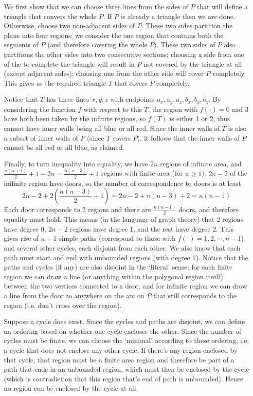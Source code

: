 \documentclass[11pt,a4paper]{article}
\begin{document}
\begin{enumerate}
	We first show that we can choose three lines from the sides of $P$ that will define a triangle that convers the whole $P$. If $P$ is already a triangle then we are done. Otherwise, choose two non-adjacent sides of $P$. These two sides partition the plane into four regions; we consider the one region that contains both the segments of $P$ (and therefore covering the whole $P$). 
	These two sides of $P$ also partitions the other sides into two consecutive sections; 
	choosing a side from one of the to complete the triangle will result in $P$ not covered by the triangle at all (except adjacent sides); choosing one from the other side will cover $P$ completely. This gives us the required triangle $T$ that covers $P$ completely. 
	
	Notice that $T$ has three lines $x, y, z$ with endpoints $a_x, a_y, a_z, b_x, b_y, b_z$. By considering the function $f$ with respect to this $T$, the region with $f(\cdot)=0$ and 3 have both been taken by the infinite regions, so $f(T)$ is either 1 or 2, thus cannot have inner walls being all blue or all red. Since the inner walls of $T$ is also a subset of inner walls of $P$ (since $T$ covers $P$), it follows that the inner walls of $P$ cannot be all red or all blue, as claimed. 
	
	Finally, to turn inequality into equality, we have $2n$ regions of infinite area, and $\frac{n(n+1)}{2}+1-2n=\frac{n(n-3)}{2}+1$ regions with finite area (for $n\ge 1$). 
	$2n-2$ of the inifinite region have doors, so the number of correspondence to doors is at least 
	\[
	2n-2+2(\frac{n(n-3)}{2}+1)=2n-2+n(n-3)+2=n(n-1)
	\]
	Each door corresponds to 2 regions and there are $\frac{n(n-1)}{2}$ doors, and therefore equality must hold. This means (in the language of graph theory) that 2 regions have degree 0, $2n-2$ regions have degree 1, and the rest have degree 2. This gives rise of $n-1$ simple paths (correspond to those with $f(\cdot)=1, 2, \cdots , n-1$) and several other cycles, each disjoint from each other. 
	We also know that each path must start and end with unbounded regions (with degree 1). 
	Notice that the paths and cycles (if any) are also disjoint in the `literal' sense: for each finite region we can draw a line (or anything within the polygonal region itself) between the two vertices connected to a door, and for infinite region we can draw a line from the door to anywhere on the arc on $P$ that still corresponds to the region (i.e. don't cross over the region). 
	
	Suppose a cycle does exist. Since the cycles and paths are disjoint, we can define an ordering based on whether one cycle encloses the other. Since the number of cycles must be finite, we can choose the `minimal' according to these ordering, i.e. a cycle that does not enclose any other cycle. If there's any region enclosed by that cycle, that region must be a finite area region and therefore be part of a path that ends in an unbounded region, which must then be enclosed by the cycle (which is contradiction that this region that's end of path is unbounded). Hence no region can be enclosed by the cycle at all. 
	

\end{enumerate}
\end{document}
